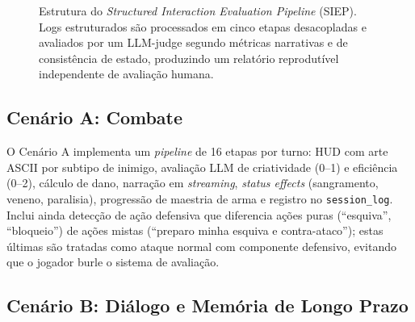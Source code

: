 \documentclass[12pt]{article}
\begin{document}
\begin{figure}[ht]
\centering
{}
\caption{Estrutura do \textit{Structured Interaction Evaluation Pipeline} (SIEP). Logs estruturados são processados em cinco etapas desacopladas e avaliados por um LLM-judge segundo métricas narrativas e de consistência de estado, produzindo um relatório reprodutível independente de avaliação humana.}
\label{fig:pipeline}
\end{figure}

\subsection{Cenário A: Combate}

O Cenário A implementa um \textit{pipeline} de 16 etapas por turno: HUD com arte ASCII por subtipo de inimigo, avaliação LLM de criatividade (0--1) e eficiência (0--2), cálculo de dano, narração em \textit{streaming}, \textit{status effects} (sangramento, veneno, paralisia), progressão de maestria de arma e registro no \texttt{session\_log}. Inclui ainda detecção de ação defensiva que diferencia ações puras (``esquiva'', ``bloqueio'') de ações mistas (``preparo minha esquiva e contra-ataco''); estas últimas são tratadas como ataque normal com componente defensivo, evitando que o jogador burle o sistema de avaliação.

\subsection{Cenário B: Diálogo e Memória de Longo Prazo}
\end{document}
